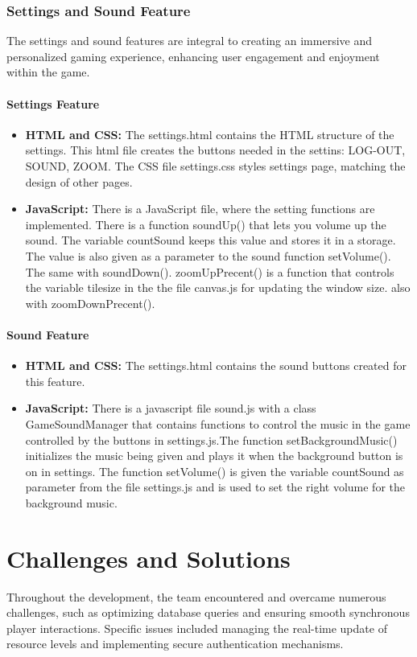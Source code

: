 \documentclass[12pt]{article}
\begin{document}
\subsubsection{Settings and Sound Feature}
The settings and sound features are integral to creating an immersive and personalized gaming experience, enhancing user engagement and enjoyment within the game.
\paragraph{Settings Feature}
\begin{itemize}
    \item \textbf{HTML and CSS:} The settings.html contains the HTML structure of the settings. This html file creates the buttons needed in the settins: LOG-OUT, SOUND, ZOOM.  The CSS file settings.css styles settings page, matching the design of other pages.
    \item \textbf{JavaScript:} There is a JavaScript file, where the setting functions are implemented. There is a function soundUp() that lets you volume up the sound. The variable countSound keeps this value and stores it in a storage. The value is also given as a parameter to the sound function setVolume(). The same with soundDown(). zoomUpPrecent() is a function that controls the variable tilesize in the the file canvas.js for updating the window size. also with zoomDownPrecent().
\end{itemize}

\paragraph{Sound Feature}
\begin{itemize}
    \item \textbf{HTML and CSS:} The settings.html contains the sound buttons created for this feature.
    \item \textbf{JavaScript:} There is a javascript file sound.js with a class GameSoundManager that contains functions to control the music in the game controlled by the buttons in settings.js.The function setBackgroundMusic() initializes the music being given and plays it when the background button is on in settings. The function setVolume() is given the variable countSound as parameter from the file settings.js and is used to set the right volume for the background music.
\end{itemize}


\section{Challenges and Solutions}
Throughout the development, the team encountered and overcame numerous challenges, such as optimizing database queries and ensuring smooth synchronous player interactions. Specific issues included managing the real-time update of resource levels and implementing secure authentication mechanisms.
\end{document}
